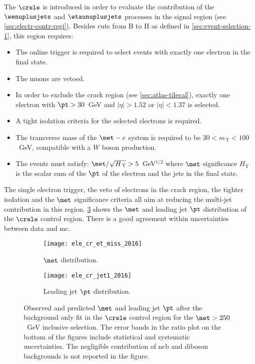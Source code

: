 The $\crele$ is introduced in order to evaluate the contribution of the
$\wenuplusjets$ and $\wtaunuplusjets$ processes in the signal region (see
\cref{sec:electr-contr-regi}). Besides cuts from B to H as defined in
\cref{sec:event-selection-1}, this region requires:
\begin{itemize}
\item The online trigger is required to select events with exactly one electron
  in the final state.
\item The muons are vetoed.
\item In order to exclude the crack region (see \cref{sec:atlas-tilecal}),
  exactly one electron with $\pt > 30$~GeV and $|\eta| > 1.52$ or $|\eta| <
  1.37$ is selected.
\item A tight isolation criteria for the selected electrons is required.
\item The transverse mass of the $\met - e$ system is required to be $30 <
  m_\mathrm{\, T} < 100$~GeV, compatible with a $W$ boson production.
\item The events must satisfy:
  $\met/\sqrt{H_\mathrm{\, T}} > 5$~GeV$^{1/2}$ where $\met$
  significance $H_\mathrm{T}$ is the scalar sum of the $\pt$ of the electron and
  the jets in the final state.
\end{itemize}
The single electron trigger, the veto of electrons in the crack region, the
tighter isolation and the $\met$ significance criteria all aim at reducing the
multi-jet contribution in this region. \cref{fig:ele_cr_plots_2016} shows the
$\met$ and leading jet $\pt$ distribution of the $\crele$ control region. There
is a good agreement within uncertainties between data and \gls{mc}. 
\begin{figure}[!th]
  \centering
  \begin{subfigure}[t]{.48\linewidth}
    \texttt{[image: ele\_cr\_et\_miss\_2016]}
    \caption{$\met$ distribution.}
    \label{fig:ele_cr_met}
  \end{subfigure}
  \begin{subfigure}[t]{.48\linewidth}
    \texttt{[image: ele\_cr\_jet1\_2016]}
    \caption{Leading jet $\pt$ distribution.}
    \label{fig:ele_cr_jet1}
  \end{subfigure}
  \caption{Observed and predicted $\met$ and leading jet $\pt$ after the
    background only fit in the $\crele$ control region for the $\met > 250$~GeV
    inclusive selection. The error bands in the ratio plot on the bottom of the
    figures include statistical and systematic uncertainties. The negligible
    contribution of \gls{ncb} and diboson backgrounds is not reported in the
    figure.}
  \label{fig:ele_cr_plots_2016}
\end{figure}

